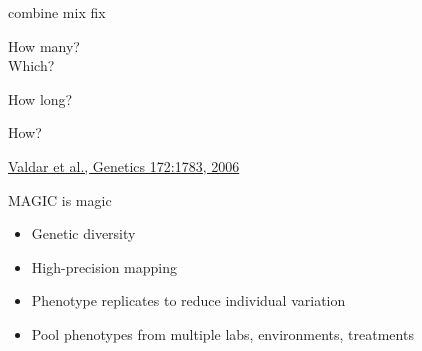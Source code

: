 \documentclass[12pt]{article}
\newcommand{\citesize}{\fontsize{14}{18} \selectfont}
\newcommand{\headsize}{\fontsize{35}{35} \selectfont}
\newcommand{\smallsize}{\fontsize{25}{30} \selectfont}
\newcommand{\smallersize}{\fontsize{20}{25} \selectfont}
\begin{document}
{\smallsize \color{myyellow}
\hspace*{52mm} combine \hspace*{35mm} mix \hspace*{52mm} fix

\smallersize
\color{mywhite}
\vspace{20pt}

\hspace*{6mm}
\begin{minipage}[t]{45mm}
\vspace*{0mm}
\centering

How many? \\[20pt]
Which?
\end{minipage}
\hspace{57mm}
\begin{minipage}[t]{45mm}
\vspace*{0mm}
\centering

How long?
\end{minipage}
\hspace{18mm}
\begin{minipage}[t]{45mm}
\vspace*{0mm}
\centering

How?
\end{minipage}


\vfill

\hfill {\citesize \color{citecolor} \href{http://www.genetics.org/content/172/3/1783.full}{Valdar et al., Genetics 172:1783, 2006}}

\vspace*{5mm}


\newpage

\headsize \color{myyellow}
\hfill \begin{minipage}{5.75in}
\centering
MAGIC is magic
\end{minipage}

\vspace{25mm}

\color{mywhite}
\smallsize

\hfill \begin{minipage}{10in}
\begin{itemize}
\itemsep24pt
\item Genetic diversity

\item High-precision mapping

\item Phenotype replicates to reduce individual variation

\item Pool phenotypes from multiple labs, environments, treatments


\end{itemize}
\end{minipage}}
\end{document}
